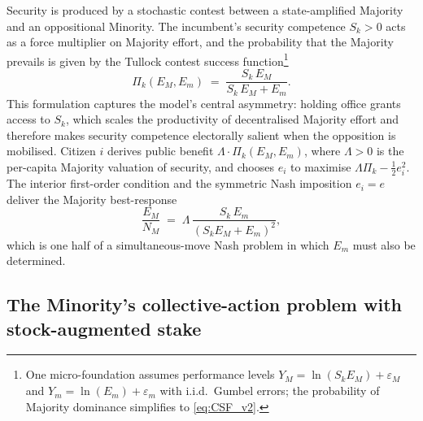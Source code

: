 \documentclass[11pt,twoside]{extarticle}
\begin{document}
Security is produced by a stochastic contest between a state-amplified Majority and an oppositional Minority. The incumbent's security competence $S_k>0$ acts as a force multiplier on Majority effort, and the probability that the Majority prevails is given by the Tullock contest success function\footnote{One micro-foundation \citep{skaperdasContestSuccessFunctions1996,jiaStochasticDerivationRatio2008} assumes performance levels $Y_M=\ln(S_kE_M)+\varepsilon_M$ and $Y_m=\ln(E_m)+\varepsilon_m$ with i.i.d.\ Gumbel errors; the probability of Majority dominance simplifies to \autoref{eq:CSF_v2}.}
\begin{equation}\label{eq:CSF_v2}
    \Pi_k(E_M,E_m)\;=\;\frac{S_k\,E_M}{S_k\,E_M+E_m}.
\end{equation}
This formulation captures the model's central asymmetry: holding office grants access to $S_k$, which scales the productivity of decentralised Majority effort and therefore makes security competence electorally salient when the opposition is mobilised. Citizen $i$ derives public benefit $\Lambda\cdot\Pi_k(E_M,E_m)$, where $\Lambda>0$ is the per-capita Majority valuation of security, and chooses $e_i$ to maximise $\Lambda\Pi_k-\tfrac{1}{2}e_i^2$. The interior first-order condition and the symmetric Nash imposition $e_i=e$ deliver the Majority best-response
\begin{equation}\label{eq:EM_BR_v2}
    \frac{E_M}{N_M}\;=\;\Lambda\,\frac{S_k\,E_m}{(S_k E_M+E_m)^2},
\end{equation}
which is one half of a simultaneous-move Nash problem in which $E_m$ must also be determined.

\subsection{The Minority's collective-action problem with stock-augmented stake}
\end{document}
